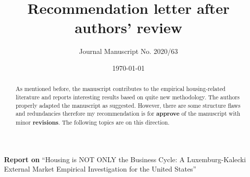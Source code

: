 \documentclass[11pt]{article}
\author{Journal Manuscript No. 2020/63}
\date{\today}
\title{Recommendation letter after authors' review}
\begin{document}
\maketitle
\noindent \textbf{Report on} ``Housing is NOT ONLY the Business Cycle: A Luxemburg-Kalecki External Market Empirical Investigation for the United States'' 


\begin{abstract}
As mentioned before, the manuscript contributes to the empirical housing-related literature and reports interesting results based on quite  new methodology.
The authors properly adapted the manuscript as suggested.
However, there are some structure flaws and redundancies therefore my recommendation is for \textbf{approve} of the manuscript with minor \textbf{revisions}.
The following topics are on this direction.
\end{abstract}
\end{document}
